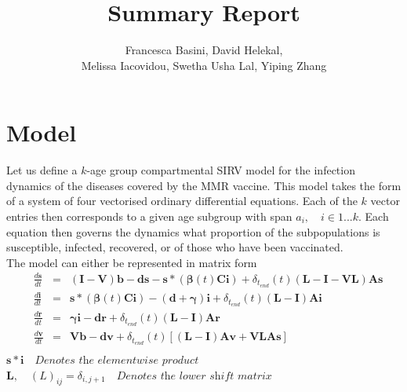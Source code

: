\documentclass{article}
\title{Summary Report}
\author{Francesca Basini, David Helekal,\\Melissa Iacovidou, Swetha Usha Lal, Yiping Zhang}
\theoremstyle{definition}
\begin{document}
\maketitle
\newpage
\section{Model}

Let us define a $k$-age group compartmental SIRV model for the infection dynamics of the diseases covered by the MMR vaccine. This model takes the form of a system of four vectorised ordinary differential equations. Each of the $k$ vector entries then corresponds to a given age subgroup with span $a_i, \quad i\in1...k$. Each equation then governs the dynamics what proportion of the subpopulations is susceptible, infected, recovered, or of those who have been vaccinated.\\
The model can either be represented in matrix form
\begin{align*}
&\frac{d\mathbf{s}}{dt} &=& (\mathbf{I}-\mathbf{V})\mathbf{b} - \mathbf{d}\mathbf{s} - \mathbf{s}*(\pmb{\beta}(t)\mathbf{C}\mathbf
{i})+\delta_{t_{end}}(t)(\mathbf{L}-\mathbf{I}-\mathbf{V}\mathbf{L})\mathbf{A}\mathbf{s}\\
&\frac{d\mathbf{i}}{dt} &=&\mathbf{s}*(\pmb{\beta}(t)\mathbf{C}\mathbf{i}) - (\mathbf{d} + \pmb{\gamma})\mathbf{i}+\delta_{t_{end}}(t)(\mathbf{L}-\mathbf{I})\mathbf{A}\mathbf{i}\\
&\frac{d\mathbf{r}}{dt} &=& \pmb{\gamma}\mathbf{i} - \mathbf{d}\mathbf{r}+\delta_{t_{end}}(t)(\mathbf{L}-\mathbf{I})\mathbf{A}\mathbf{r}\\
&\frac{d\mathbf{v}}{dt} &=& \mathbf{V}\mathbf{b}-\mathbf{d}\mathbf{v} +\delta_{t_{end}}(t)[(\mathbf{L}-\mathbf{I})\mathbf{A}\mathbf{v}+\mathbf{V}\mathbf{L}\mathbf{A}\mathbf{s}]\\
\end{align*}
$\mathbf{s}*\mathbf{i}\quad\textit{Denotes the elementwise product}$\\
$\mathbf{L},\quad(L)_{ij}=\delta_{i,j+1}\quad \textit{Denotes the lower shift matrix}$
\end{document}
